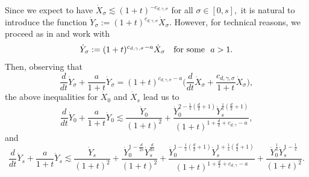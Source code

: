 \documentclass[11pt,twoside]{amsart}
\begin{document}
Since we expect to have  $\dot X_\sigma\lesssim (1+t)^{-c_{d,\gamma,\sigma}}$ for all $\sigma\in[0,s],$
it is natural  to introduce the function $\dot Y_\sigma:=(1+t)^{c_{d,\gamma,\sigma}}\dot X_\sigma.$
However, for technical reasons, we proceed as in \cite{G2} and  work with 
\begin{equation}\label{eq:Y}
\dot Y_\sigma:=(1+t)^{c_{d,\gamma,\sigma}-a}\dot X_\sigma\quad\hbox{for some }\ a>1.\end{equation}
Then, observing that
$$
\frac d{dt}\dot Y_\sigma +\frac a{1+t}\dot Y_\sigma
=(1+t)^{c_{d,\gamma,\sigma}-a}\biggl(\frac d{dt}\dot X_\sigma+\frac{c_{d,\gamma,\sigma}}{1+t}\dot X_\sigma\biggr),
$$
the above inequalities for $\dot X_0$ and $\dot X_s$ lead us to
$$
\frac d{dt}\dot Y_0+\frac{a}{1+t}\dot Y_0\lesssim \frac{\dot Y_0}{(1+t)^2}
+\frac{\dot Y_0^{2-\frac1s(\frac d2+1)}\dot Y_s^{\frac1s(\frac d2+1)}}{(1+t)^{1+\frac d2+c_{d,\gamma}-a}},
$$
and
$$
\frac d{dt}\dot Y_s+\frac{a}{1+t}\dot Y_s\lesssim \frac{\dot Y_s}{(1+t)^2}+\frac{\dot Y_0^{1-\frac d{2s}}\dot Y_s^{\frac d{2s}}}{(1+t)^{2}}
+\frac{\dot Y_0^{1-\frac 1s(\frac d2+1)}\dot Y_s^{1+\frac1s(\frac d2+1)}}{(1+t)^{1+\frac d2+c_{d,\gamma}-a}}
+\frac{\dot Y_0^{\frac1s}\dot Y_s^{1-\frac1s}}{(1+t)^2}.
$$
\end{document}
